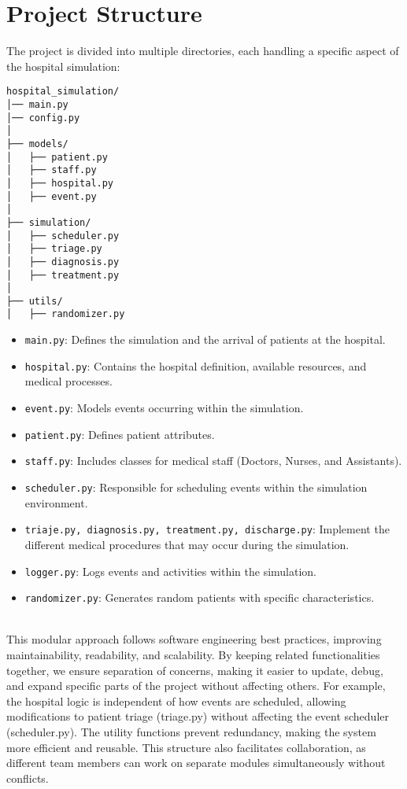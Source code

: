 \documentclass[a4paper,12pt]{article}
\begin{document}
\section{Project Structure}
The project is divided into multiple directories, each handling a specific aspect of the hospital simulation:
\\
\noindent
\begin{lstlisting}[basicstyle=\ttfamily\small]
hospital_simulation/
│── main.py                    
│── config.py                  
│
├── models/                    
│   ├── patient.py             
│   ├── staff.py               
│   ├── hospital.py            
│   ├── event.py               
│
├── simulation/                
│   ├── scheduler.py           
│   ├── triage.py              
│   ├── diagnosis.py           
│   ├── treatment.py                     
│
├── utils/                                 
│   ├── randomizer.py          
\end{lstlisting}
 
\begin{itemize}
\item \texttt{main.py}: Defines the simulation and the arrival of patients at the hospital.
\item \texttt{hospital.py}: Contains the hospital definition, available resources, and medical processes.
\item \texttt{event.py}: Models events occurring within the simulation.
\item \texttt{patient.py}: Defines patient attributes.
\item \texttt{staff.py}: Includes classes for medical staff (Doctors, Nurses, and Assistants).
\item \texttt{scheduler.py}: Responsible for scheduling events within the simulation environment.
\item \texttt{triaje.py, diagnosis.py, treatment.py, discharge.py}: Implement the different medical procedures that may occur during the simulation.
\item \texttt{logger.py}: Logs events and activities within the simulation.
\item \texttt{randomizer.py}: Generates random patients with specific characteristics.
\end{itemize}
\\
This modular approach follows software engineering best practices, improving maintainability, readability, and scalability. By keeping related functionalities together, we ensure separation of concerns, making it easier to update, debug, and expand specific parts of the project without affecting others. 
For example, the hospital logic is independent of how events are scheduled, allowing modifications to patient triage (triage.py) without affecting the event scheduler (scheduler.py). The utility functions prevent redundancy, making the system more efficient and reusable. This structure also facilitates collaboration, as different team members can work on separate modules simultaneously without conflicts.
\end{document}
